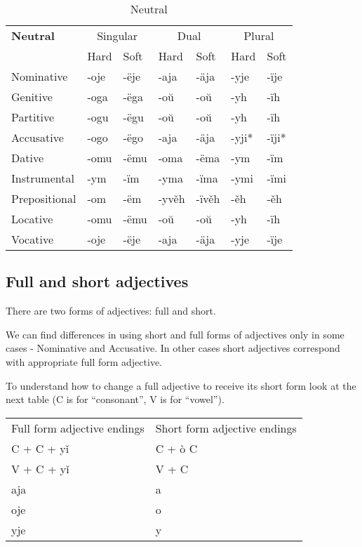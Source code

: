 \begin{table}[!htb]
	\caption{Neutral}
	\begin{tabular}{lllllll}
		\textbf{Neutral}       
		& \multicolumn{2}{c}{Singular} 
		& \multicolumn{2}{c}{Dual} 
		& \multicolumn{2}{c}{Plural} \\
		& Hard   & Soft  & Hard   & Soft   & Hard  & Soft \\
		Nominative    & -oje & -ëje     
		& -aja  & -äja        
		& -yje & -ïje \\
		Genitive      & -oga & -ëga 
		& -oŭ & -oŭ
		& -yh & -ïh \\
		Partitive     & -ogu & -ëgu 
		& -oŭ & -oŭ
		& -yh & -ïh \\
		Accusative    & -ogo & -ëgo     
		& -aja & -äja
		& -yji* & -ïji*  \\
		Dative		  & -omu & -ëmu
		& -oma & -ëma 
		& -ym & -ïm \\  
		Instrumental  & -ym & -ïm     
		& -yma & -ïma   
		& -ymi & -ïmi \\
		Prepositional & -om & -ëm  
		& -yvěh & -ïvěh     
		& -ěh & -ěh \\
		Locative      & -omu & -ëmu      
		& -oŭ & -oŭ
		& -yh & -ïh \\
		Vocative       & -oje & -ëje     
		& -aja  & -äja        
		& -yje & -ïje 
	\end{tabular}
\end{table}

\subsection{Full and short adjectives}

There are two forms of adjectives: full and short.

We can find differences in using short and full forms of adjectives only in some cases - Nominative and Accusative. In other cases short adjectives correspond with appropriate full form adjective.

To understand how to change a full adjective to receive its short form look at the next table (C is for “consonant”, V is for “vowel”).

\begin{table}
	\begin{tabular}{ll}
		Full form adjective endings & Short form adjective endings \\
		C + C + yǐ & C + ò C \\
	    V + C + yǐ & V + C \\
		aja & a \\
		oje  & o \\
		yje & y \\
	\end{tabular}
\end{table}

